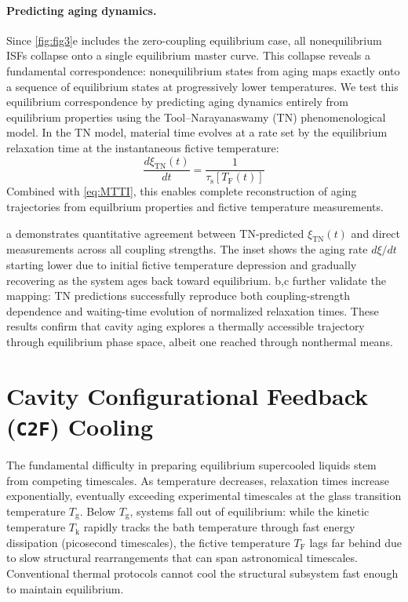 \documentclass[%
 reprint,
 amsmath,amssymb,
 aps,
]{revtex4-2}
\begin{document}
\paragraph*{Predicting aging dynamics.} 
Since \cref{fig:fig3}e includes the zero-coupling equilibrium case, all nonequilibrium ISFs collapse onto a single equilibrium master curve. 
This collapse reveals a fundamental correspondence: nonequilibrium states from aging maps exactly onto a sequence of equilibrium states at progressively lower temperatures.
We test this equilibrium correspondence by predicting aging dynamics entirely from equilibrium properties using the Tool--Narayanaswamy (TN) phenomenological model. 
In the TN model, material time evolves at a rate set by the equilibrium relaxation time at the instantaneous fictive temperature:
\begin{equation}
    \frac{d \xi_\mathrm{TN}(t)}{d t}  = \frac{1}{\tau_\mathrm{s}[T_\mathrm{F}(t)]}
\end{equation}
Combined with \cref{eq:MTTI}, this enables complete reconstruction of aging trajectories from equilbrium properties and fictive temperature measurements.

a demonstrates quantitative agreement between TN-predicted $\xi_\mathrm{TN}(t)$ and direct measurements across all coupling strengths.
The inset shows the aging rate $d\xi/dt$ starting lower due to initial fictive temperature depression and gradually recovering as the system ages back toward equilibrium.
b,c further validate the mapping: TN predictions successfully reproduce both coupling-strength dependence and waiting-time evolution of normalized relaxation times.
These results confirm that cavity aging explores a thermally accessible trajectory through equilibrium phase space, albeit one reached through nonthermal means.

\section*{Cavity Configurational Feedback (\texttt{C2F}) Cooling}

The fundamental difficulty in preparing equilibrium supercooled liquids stem from competing timescales. As temperature decreases, relaxation times increase exponentially, eventually exceeding experimental timescales at the glass transition temperature $T_\mathrm{g}$. Below $T_\mathrm{g}$, systems fall out of equilibrium: while the kinetic temperature $T_\mathrm{k}$ rapidly tracks the bath temperature through fast energy dissipation (picosecond timescales), the fictive temperature $T_\mathrm{F}$ lags far behind due to slow structural rearrangements that can span astronomical timescales. Conventional thermal protocols cannot cool the structural subsystem fast enough to maintain equilibrium.
\end{document}
